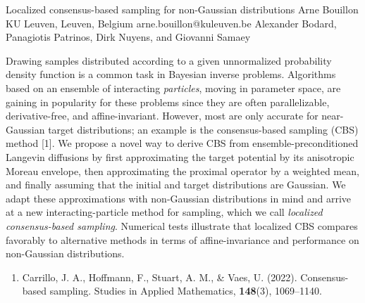\begin{talk}
  {Localized consensus-based sampling for non-Gaussian distributions}%
  {Arne Bouillon}%
  {KU Leuven, Leuven, Belgium}%
  {arne.bouillon@kuleuven.be}%
  {Alexander Bodard, Panagiotis Patrinos, Dirk Nuyens, and Giovanni Samaey}%
  
    

  Drawing samples distributed according to a given unnormalized probability density function is a common task in Bayesian inverse problems. Algorithms based on an ensemble of interacting \emph{particles}, moving in parameter space, are gaining in popularity for these problems since they are often parallelizable, derivative-free, and affine-invariant. However, most are only accurate for near-Gaussian target distributions; an example is the consensus-based sampling (CBS) method [1]. We propose a novel way to derive CBS from ensemble-preconditioned Langevin diffusions by first approximating the target potential by its anisotropic Moreau envelope, then approximating the proximal operator by a weighted mean, and finally assuming that the initial and target distributions are Gaussian. We adapt these approximations with non-Gaussian distributions in mind and arrive at a new interacting-particle method for sampling, which we call \emph{localized consensus-based sampling}. Numerical tests illustrate that localized CBS compares favorably to alternative methods in terms of affine-invariance and performance on non-Gaussian distributions.
\medskip

\begin{enumerate}
  \item[{[1]}] Carrillo, J. A., Hoffmann, F., Stuart, A. M., \& Vaes, U. (2022). Consensus-based sampling. Studies in Applied Mathematics, \textbf{148}(3), 1069--1140.
\end{enumerate}
\end{talk}
